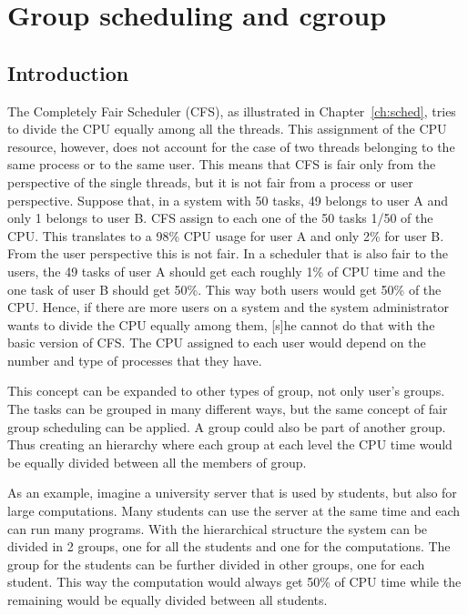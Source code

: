 \chapter{Group scheduling and cgroup} %
\label{ch:cgroup}
\section{Introduction}

The Completely Fair Scheduler (CFS), as illustrated in Chapter~\ref{ch:sched}, tries to divide the CPU equally among all the threads. This assignment of the CPU resource, however, does not account for the case of two threads belonging to the same process or to the same user. This means that CFS is fair only from the perspective of the single threads, but it is not fair from a process or user perspective. 
Suppose that, in a system with 50 tasks, 49 belongs to user A and only 1 belongs to user B. CFS assign to each one of the 50 tasks 1/50 of the CPU. This translates to a 98\% CPU usage for user A and only 2\% for user B. From the user perspective this is not fair.
In a scheduler that is also fair to the users, the 49 tasks of user A should get each roughly 1\% of CPU time and the one task of user B should get 50\%. This way both users would get 50\% of the CPU. 
Hence, if there are more users on a system and the system administrator wants to divide the CPU equally among them, [s]he cannot do that with the basic version of CFS. The CPU assigned to each user would depend on the number and type of processes that they have.

This concept can be expanded to other types of group, not only user's groups. The tasks can be grouped in many different ways, but the same concept of fair group scheduling can be applied. A group could also be part of another group. Thus creating an hierarchy where each group at each level the CPU time would be equally divided between all the members of group.

As an example, imagine a university server that is used by students, but also for large computations. Many students can use the server at the same time and each can run many programs. With the hierarchical structure the system can be divided in 2 groups, one for all the students and one for the computations. The group for the students can be further divided in other groups, one for each student. This way the computation would always get 50\% of CPU time while the remaining would be equally divided between all students.

